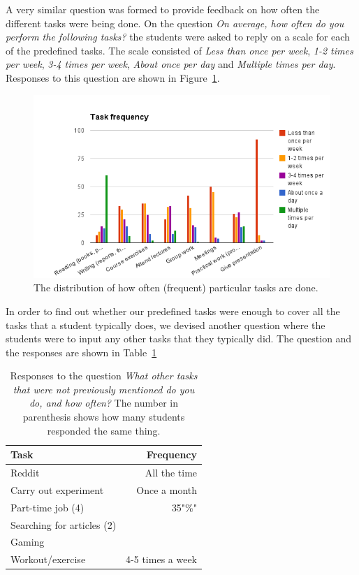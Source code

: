 A very similar question was formed to provide feedback on how often the different tasks were being done. On the question \emph{On average, how often do you perform the following tasks?} the students were asked to reply on a scale for each of the predefined tasks. The scale consisted of \emph{Less than once per week}, \emph{1-2 times per week}, \emph{3-4 times per week}, \emph{About once per day} and \emph{Multiple times per day}. Responses to this question are shown in Figure~\ref{fig:taskfrequency}.
\begin{figure}[tbp]
  \centering
  \includegraphics[width=\textwidth]{figures/TaskFrequency.png}
  \caption[Student task frequency]{The distribution of how often (frequent) particular tasks are done.}
  \label{fig:taskfrequency}
\end{figure}

In order to find out whether our predefined tasks were enough to cover all the tasks that a student typically does, we devised another question where the students were to input any other tasks that they typically did. The question and the responses are shown in Table~\ref{tab:othertasksresponses}
\begin{table}[tbp]
  \centering
  \begin{tabular}{|l|r|}
	\hline
	\textbf{Task} & \textbf{Frequency} \\
	\hline
	Reddit & All the time \\
  \hline
	Carry out experiment & Once a month \\
	\hline
	Part-time job (4) & 35"\%" \\
	\hline
	Searching for articles (2) &  \\
	\hline
	Gaming & \\
	\hline
	Workout/exercise & 4-5 times a week \\
	\hline
  \end{tabular}
  \caption[Other student tasks response]{Responses to the question \emph{What other tasks that were not previously mentioned do you do, and how often?} The number in parenthesis shows how many students responded the same thing.}
  \label{tab:othertasksresponses}
\end{table}



